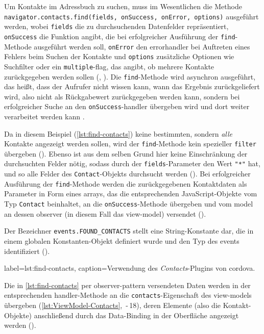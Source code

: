 Um Kontakte im Adressbuch zu suchen, muss im Wesentlichen die Methode \lstinline|navigator.contacts.find(fields, onSuccess, onError, options)| ausgeführt werden, wobei \lstinline|fields| die zu durchsuchenden Datenfelder repräsentiert, \lstinline|onSuccess| die Funktion angibt, die bei erfolgreicher Ausführung der \lstinline|find|-Methode ausgeführt werden soll, \lstinline|onError| den \gls{errorhandler} bei Auftreten eines Fehlers beim Suchen der Kontakte und \lstinline|options| zusätzliche Optionen wie Suchfilter oder ein \lstinline|multiple|-\gls{flag}, das angibt, ob mehrere Kontakte zurückgegeben werden sollen (, ).
Die \lstinline|find|-Methode wird \gls{asynchron} ausgeführt, das heißt, dass der Aufrufer nicht wissen kann, wann das Ergebnis zurückgeliefert wird, also nicht als Rückgabewert zurückgegeben werden kann, sondern bei erfolgreicher Suche an den \og \lstinline|onSuccess|-\gls{handler} übergeben wird und dort weiter verarbeitet werden kann \cite{Cordova_Plugin_Registry_Contacts}.

Da in diesem Beispiel (\autoref{lst:find-contacts}) keine bestimmten, sondern \emph{alle} Kontakte angezeigt werden sollen, wird der \lstinline|find|-Methode kein spezieller \lstinline|filter| übergeben (). 
Ebenso ist aus dem selben Grund hier keine Einschränkung der durchsuchten Felder nötig, sodass durch der \lstinline|fields|-Parameter den Wert \lstinline|"*"| hat, und so alle Felder des \lstinline|Contact|-Objekts durchsucht werden ().
Bei erfolgreicher Ausführung der \lstinline|find|-Methode werden die zurückgegebenen Kontaktdaten als Parameter in Form eines \glspl{array}, das die entsprechenden JavaScript-Objekte vom Typ \lstinline|Contact| beinhaltet, an die \lstinline|onSuccess|-Methode übergeben und vom \gls{model} an dessen \gls{observer} (in diesem Fall das \gls{view-model}) versendet (). 

Der Bezeichner \lstinline|events.FOUND_CONTACTS| stellt eine String-Konstante dar, die in einem globalen Konstanten-Objekt definiert wurde und den Typ des \glspl{event} identifiziert ().

	 { label=lst:find-contacts, caption={Verwendung des \emph{Contacts}-Plugins von \gls{cordova}.}}

Die in \autoref{lst:find-contacts} per \gls{observer-pattern} versendeten Daten werden in der entsprechenden \gls{handler}-Methode an die \lstinline|contacts|-Eigenschaft des \glspl{view-model} übergeben (\autoref{lst:ViewModel-Contacts}, \,-\,18), deren Elemente (also die Kontakt-Objekte) anschließend durch das Data-Binding in der Oberfläche angezeigt werden (\su).


